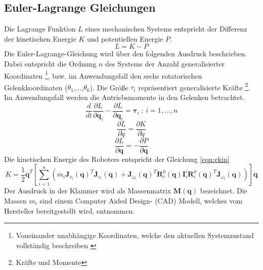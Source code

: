 \subsection{Euler-Lagrange Gleichungen}
Die Lagrange Funktion $L$ eines mechanischen Systems entspricht der Differenz der kinetischen Energie $K$ und potentiellen Energie $P$.~\autocite[S.~175]{Spong.2020}
\begin{equation}
	L = K-P 
\end{equation}
%
%
%
Die Euler-Lagrange-Gleichung wird über den folgenden Ausdruck beschrieben. Dabei entspricht die Ordnung $n$ des Systems der Anzahl generalisierter Koordinaten \footnote{Voneinander unabhängige Koordinaten, welche den aktuellen Systemzustand vollständig beschreiben \cite{Engelke.2008}}, bzw. im Anwendungsfall den sechs rotatorischen Gelenkkoordinaten ($\theta_1$,...,$\theta_6$). Die Größe $\tau_i$ repräsentiert generalisierte Kräfte \footnote{Kräfte und Momente}. Im Anwendungsfall werden die Antriebsmomente in den Gelenken betrachtet. 
%
\begin{equation}
	\frac{d}{dt} \frac{\partial{L}}{\partial{\dot{\bm{q}_i}}}- \frac{\partial{L}}{\partial{\bm{q}_i}} = \bm{\tau}_i \ ;  \ i = 1,...,n 
\end{equation}
%
\begin{equation}
	\frac{\partial{L}}{\partial{\dot{q}}} = \frac{\partial{K}}{\partial{\dot{q}}}
\end{equation}
%
\begin{equation}
	\frac{\partial{L}}{\partial{\bm{q}}} = -\frac{\partial{P}}{\partial{\bm{q}}}
\end{equation}
%
Die kinetischen Energie des Roboters entspricht der Gleichung  \ref{eqn:ekin}
\begin{equation}
	\label{eqn:ekin}
	K = \frac{1}{2} \dot{\bm{\bm{q}}}^T \left[\sum_{i=1}^{n} \left( m_i \bm{J}_{v_i}(\bm{q})^T \bm{J}_{v_i}(\bm{q}) + \bm{J}_{\omega_i}(\bm{q})^T \bm{R}^0_i(\bm{q}) \bm{I}^{i}_{i} \bm{R}^0_i(\bm{q})^T \bm{J}_{\omega_i}(\bm{q}) \right) \right]\dot{\bm{\bm{q}}}
\end{equation}
%
Der Ausdruck in der Klammer wird als Massenmatrix $\bm{M}(\bm{q})$ bezeichnet. 
Die Massen $m_i$ sind einem Computer Aided Design- (CAD) Modell, welches vom Hersteller bereitgestellt wird, entnommen. 
